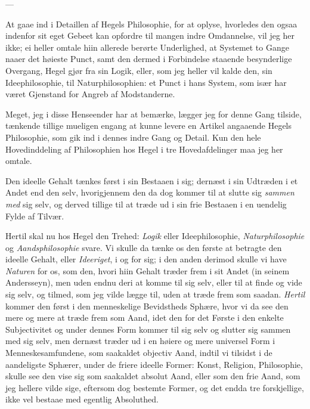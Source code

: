 \documentclass[12pt,a4paper]{book}
\newcommand{\apage}[1]{\marginnote{\footnotesize\textit{[#1]}}}
\begin{document}
\begin{center}---\end{center}

At gaae ind i Detaillen af Hegels Philosophie, for at oplyse, hvorledes
den ogsaa indenfor sit eget Gebeet kan opfordre til mangen indre
Omdannelse, vil jeg her ikke; ei heller omtale hiin allerede berørte
Underlighed, at Systemet to Gange naaer det \apage{71} høieste Punct, samt den
dermed i Forbindelse staaende besynderlige Overgang, Hegel gjør fra sin
Logik, eller, som jeg heller vil kalde den, sin Ideephilosophie, til
Naturphilosophien: et Punct i hans System, som især har været Gjenstand
for Angreb af Modstanderne.
Meget, jeg i disse Henseender har at bemærke, lægger jeg for denne Gang
tilside, tænkende tillige mueligen engang at kunne levere en Artikel
angaaende Hegels Philosophie, som gik ind i dennes indre Gang og
Detail. Kun den hele Hovedinddeling af Philosophien hos Hegel i tre
Hovedafdelinger maa jeg her omtale.

Den ideelle Gehalt tænkes først i sin Bestaaen i sig; dernæst i sin
Udtræden i et Andet end den selv, hvorigjennem den da dog kommer til at
slutte sig \emph{sammen med} sig selv, og derved tillige til at træde ud i sin
frie Bestaaen i en uendelig Fylde af Tilvær.

Hertil skal nu hos Hegel den Trehed: \emph{Logik} eller Ideephilosophie,
\emph{Naturphilosophie} og \emph{Aandsphilosophie} svare. Vi skulle da tænke os den
første at betragte den ideelle Gehalt, eller \emph{Ideeriget}, i og for sig; i
den anden derimod skulle vi have \emph{Naturen} for os, som den, hvori hiin
Gehalt træder frem i sit Andet (in seinem Andersseyn), men uden endnu
deri at komme til sig selv, eller til at finde og vide sig selv, og
tilmed, som jeg vilde lægge til, uden at træde frem som saadan. \emph{Hertil}
kommer den først i den menneskelige Bevidstheds Sphære, hvor vi da see
den mere og mere at træde frem som Aand, idet den for det Første i den
enkelte Subjectivitet og under dennes Form kommer til sig selv og
slutter sig sammen med sig selv, men dernæst træder ud i en høiere og
mere universel Form i Menneskesamfundene, som saakaldet objectiv Aand,
indtil vi tilsidst i de aandeligste Sphærer, under de friere ideelle
Former: Konst, Religion, Philosophie, skulle see den vise sig som
saakaldet absolut Aand, eller som den frie Aand, som jeg hellere vilde
sige, \apage{72} eftersom dog bestemte Former, og det endda tre forskjellige,
ikke vel bestaae med egentlig Absoluthed.
\end{document}

